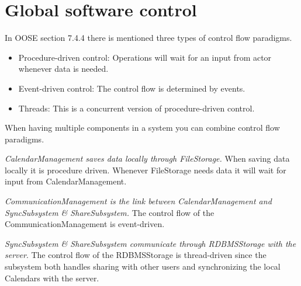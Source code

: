\section{Global software control}

In OOSE section 7.4.4 there is mentioned three types of control flow paradigms. 

\begin{itemize}
	\item Procedure-driven control: Operations will wait for an input from actor whenever data is needed. 
	\item Event-driven control: The control flow is determined by events.
	\item Threads: This is a concurrent version of procedure-driven control.
\end{itemize}

 When having multiple components in a system you can combine control flow paradigms.
 
 \emph{CalendarManagement saves data locally through FileStorage.} When saving data locally it is procedure driven. Whenever FileStorage needs data it will wait for input from CalendarManagement.
 
 \emph{CommunicationManagement is the link between CalendarManagement and SyncSubsystem \& ShareSubsystem.} The control flow of the CommunicationManagement is event-driven.
 
 \emph{SyncSubsystem \& ShareSubsystem communicate through RDBMSStorage with the server}. The control flow of the RDBMSStorage is thread-driven since the subsystem both handles sharing with other users and synchronizing the local Calendars with the server. 